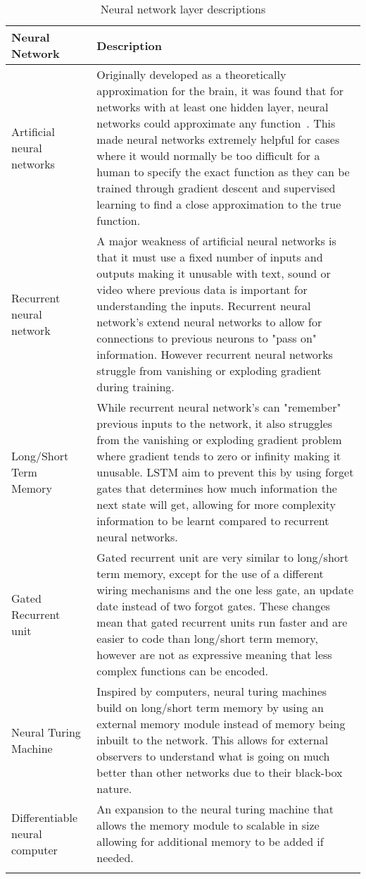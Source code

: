 \begin{longtable}{|p{3.5cm}|p{10cm}|} \hline
    \textbf{Neural Network} & \textbf{Description} \\ \hline
    Artificial neural networks~\citep{ANN} & Originally developed as a theoretically approximation for the brain, it
        was found that for networks with at least one hidden layer, neural networks could approximate any
        function~\citep{csaji2001approximation}. This made neural networks extremely helpful for cases where it would
        normally be too difficult for a human to specify the exact function as they can be trained through gradient
        descent and supervised learning to find a close approximation to the true function. \\ \hline

    Recurrent neural network~\citep{RNN} & A major weakness of artificial neural networks is that it must use a fixed
        number of inputs and outputs making it unusable with text, sound or video where previous data is important
        for understanding the inputs. Recurrent neural network's extend neural networks to allow for connections to
        previous neurons to "pass on" information. However recurrent neural networks struggle from vanishing or
        exploding gradient during training. \\ \hline

    Long/Short Term Memory~\citep{LSTM} & While recurrent neural network's can "remember" previous inputs to the
        network, it also struggles from the vanishing or exploding gradient problem where gradient tends to zero or
        infinity making it unusable. LSTM aim to prevent this by using forget gates that determines how much
        information the next state will get, allowing for more complexity information to be learnt compared to
        recurrent neural networks. \\ \hline

    Gated Recurrent unit~\citep{GRU} & Gated recurrent unit are very similar to long/short term memory, except for the
        use of a different wiring mechanisms and the one less gate, an update date instead of two forgot gates.
        These changes mean that gated recurrent units run faster and are easier to code than long/short term memory,
        however are not as expressive meaning that less complex functions can be encoded. \\ \hline

    Neural Turing Machine~\citep{NTM} & Inspired by computers, neural turing machines build on long/short term memory
        by using an external memory module instead of memory being inbuilt to the network. This allows for external
        observers to understand what is going on much better than other networks due to their black-box nature. \\ \hline

    Differentiable neural computer~\citep{DNC} & An expansion to the neural turing machine that allows the memory
        module to scalable in size allowing for additional memory to be added if needed. \\ \hline
    \caption{Neural network layer descriptions}
    \label{tab:neural_network_layers}
\end{longtable}

